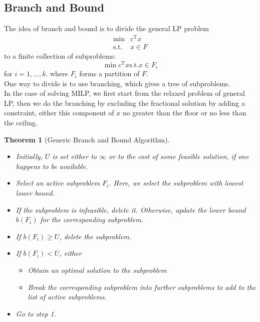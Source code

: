 \documentclass[12pt]{article}
\newcommand{\st}{\mathrm{s.t.}}
\newcommand{\T}{\mathrm{T}}
\newtheorem{theorem}{Theorem}[section]
\theoremstyle{definition}
\begin{document}
\subsection{Branch and Bound}
The idea of branch and bound is to divide the general LP problem
\begin{align*}
\min & c^\T x\\
\st & x\in F
\end{align*}
to a finite collection of subproblems:
\[
\min c^\T x \st x\in F_i
\]
for $i = 1,\ldots, k$. where $F_i$ forms a partition of $F$.\\
One way to divide is to use branching, which gives a tree of subproblems.\\
In the case of solving MILP, we first start from the relaxed problem of general LP, then we do the branching by excluding the fractional solution by adding a constraint, either this component of $x$ no greater than the floor or no less than the ceiling.
\begin{theorem}[Generic Branch and Bound Algorithm]
\hfill\\\normalfont 
\begin{itemize}
	\item[Step 0] Initially, $U$ is set either to $\infty$ or to the cost of some feasible solution, if one happens to be available. 
	\item[Step 1] Select an active subproblem $F_i$. Here, we select the subproblem with lowest lower bound.
	\item[Step 2] If the subproblem is infeasible, delete it. Otherwise, update the lower bound $b(F_i)$ for the corresponding subproblem.
	\item[Step 3] If $b(F_i)\geq U$, delete the subproblem.
	\item[Step 4] If $b(F_i)<U$, either
	\begin{itemize}
	\item Obtain an optimal solution to the subproblem
	\item Break the corresponding subproblem into further subproblems to add to the list of active subproblems.
	\end{itemize}
	\item[Step 5] Go to step 1.
\end{itemize} 
\end{theorem}
\end{document}
